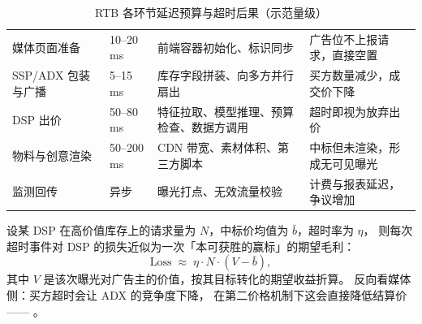 \begin{table}[htbp]
\centering
\caption{RTB 各环节延迟预算与超时后果（示范量级）}
\label{tab:rtb-latency}
\small
\begin{tabularx}{\textwidth}{L{2.9cm} L{1.9cm} L{3.4cm} Y}
\toprule
{} &  &  &  \\
\midrule
媒体页面准备 & 10--20\,ms & 前端容器初始化、标识同步 & 广告位不上报请求，直接空置 \\
\addlinespace
SSP/ADX 包装与广播 & 5--15\,ms & 库存字段拼装、向多方并行扇出 & 买方数量减少，成交价下降 \\
\addlinespace
DSP 出价 & 50--80\,ms & 特征拉取、模型推理、预算检查、数据方调用 & 超时即视为放弃出价 \\
\addlinespace
物料与创意渲染 & 50--200\,ms & CDN 带宽、素材体积、第三方脚本 & 中标但未渲染，形成无可见曝光 \\
\addlinespace
监测回传 & 异步 & 曝光打点、无效流量校验 & 计费与报表延迟，争议增加 \\
\bottomrule
\end{tabularx}
\end{table}

\begin{formulacard}[超时率的经济代价]
设某 DSP 在高价值库存上的请求量为 $N$，中标价均值为 $\bar{b}$，超时率为 $\eta$，
则每次超时事件对 DSP 的损失近似为一次「本可获胜的赢标」的期望毛利：
\begin{equation}
\text{Loss} \;\approx\; \eta \cdot N \cdot (V - \bar{b}) ,
\label{eq:timeout}
\end{equation}
其中 $V$ 是该次曝光对广告主的价值，按其目标转化的期望收益折算。
反向看媒体侧：买方超时会让 ADX 的竞争度下降，
在第二价格机制下这会直接降低结算价——
。
\end{formulacard}

